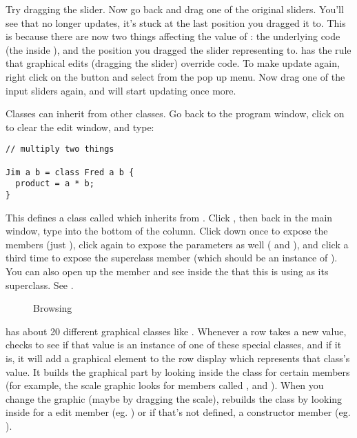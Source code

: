 Try dragging the  slider. Now go back and drag one of the
original sliders.  You'll see that  no longer updates, it's stuck
at the last position you dragged it to. This is because there are now two
things affecting the value of : the underlying code (the  inside ), and the position you dragged the slider representing
 to. \nip{} has the rule that graphical edits (dragging the slider)
override code. To make  update again, right click on the 
button and select  from the pop up menu. Now drag one of
the input sliders again, and  will start updating once more.

Classes can inherit from other classes. Go back to the program window,
click on  to clear the edit window, and type:

\begin{verbatim}
// multiply two things
 
Jim a b = class Fred a b {
  product = a * b;
}
\end{verbatim}

This defines a class called  which inherits from . Click
, then back in
the main window, type  into the bottom of the column. Click down
once to expose the members (just ), click again to expose the
parameters as well ( and ), and click a third time to expose
the superclass member (which should be an instance of ). You can
also open up the  member and see inside the  that this
 is using as its superclass. See .

\begin{figure}
\caption{Browsing }
\end{figure}

\nip{} has about 20 different graphical classes like . Whenever a
row takes a new value, \nip{} checks to see if that value is an instance of
one of these special classes, and if it is, it will add a graphical element to
the row display which represents that class's value. It builds the graphical
part by looking inside the class for certain members (for example, the scale
graphic looks for members called ,  and ). When
you change the graphic (maybe by dragging the scale), \nip{} rebuilds
the class by looking inside for a edit member (eg. )
or if that's not defined, a constructor member (eg. ).

